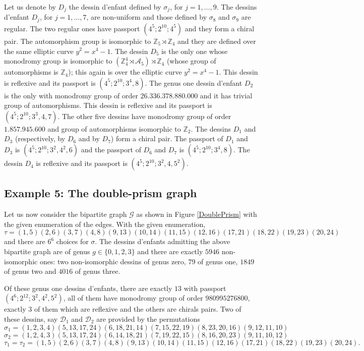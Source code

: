 \documentclass[12pt]{amsart}
\theoremstyle{remark}
\begin{document}
Let us denote by $D_{j}$ the dessin d'enfant defined by $\sigma_{j}$, for $j=1,\ldots,9$.
The dessins d'enfant $D_{j}$, for $j=1,\ldots,7$, are non-uniform and those defined by $\sigma_{8}$ and $\sigma_{9}$ are regular. 
The two regular ones have passport $(4^5;2^{10};4^5)$ and they form a chiral pair. The automorphism group is isomorphic to ${\mathbb Z}_{5} \rtimes {\mathbb Z}_{4}$ and they are defined over the same elliptic curve $y^{2}=x^{4}-1$. 
The dessin $D_{5}$ is the only one whose monodromy group is isomorphic to $({\mathbb Z}_{4}^{4} \rtimes {\mathcal A}_{5}) \rtimes {\mathbb Z}_{4}$ (whose group of automorphisms is ${\mathbb Z}_{4}$); this again is over the elliptic curve $y^{2}=x^{4}-1$. This dessin is reflexive and its passport is $(4^5;2^{10};3^4,8)$.
The genus one dessin d'enfant $D_{2}$ is the only with monodromy group of order $26.336.378.880.000$ and it has trivial group of automorphisms. This dessin is reflexive and its passport is $(4^5;2^{10};3^3,4,7)$.
The other five dessins have monodromy group of order $1.857.945.600$ and group of automorphisms isomorphic to ${\mathbb Z}_{2}$. The dessins $D_{1}$ and $D_{3}$ (respectively, by $D_{6}$ and by $D_{7}$) form a chiral pair. The passport of $D_{1}$ and $D_{3}$ is $(4^5;2^{10};3^2,4^2,6)$ and the passport of $D_{6}$ and $D_{7}$ is $(4^5;2^{10};3^4,8)$.  The dessin $D_{4}$ is reflexive and its passport is $(4^5;2^{10};3^2,4,5^2)$.

\subsection{Example 5: The double-prism graph}\label{Sec:doble-prisma}
Let us now consider the bipartite graph ${\mathcal G}$ as shown in Figure \ref{DoublePrism} with the given enumeration of the edges. With the given enumeration,
$$\tau=(1,5)(2,6)(3,7)(4,8)(9,13)(10,14)(11,15)(12,16)(17,21)(18,22)(19,23)(20,24)$$
and there are $6^6$ choices for $\sigma$. The dessins d'enfants admitting the above bipartite graph are of genus $g \in \{0,1,2,3\}$ and there are exactly $5946$ non-isomorphic ones: two non-isomorphic dessins of genus zero, $79$ of genus one, $1849$ of genus two and $4016$ of genus three. 

Of these genus one dessins d'enfants, there are exactly $13$ with passport $(4^6;2^{12};3^2,4^2,5^2)$, all of them have monodromy group of order $980995276800$, exactly $3$ of them which are reflexive and the others are chirals pairs. Two of these dessins, say ${\mathcal D}_{1}$ and ${\mathcal D}_{2}$ are provided by the permutations
 $$\sigma_{1}=(1,2,3,4)(5,13,17,24)(6,18,21,14)(7,15,22,19)(8,23,20,16)(9,12,11,10)$$
$$\sigma_{2}=(1,2,4,3)(5,13,17,24)(6,14,18,21)(7,19,22,15)(8,16,20,23)
(9,11,10,12)$$
$$\tau_{1}=\tau_{2}=(1,5)(2,6)(3,7)(4,8)(9,13)(10,14)(11,15)(12,16)(17,21)(18,22)
(19,23)(20,24).$$
\end{document}
